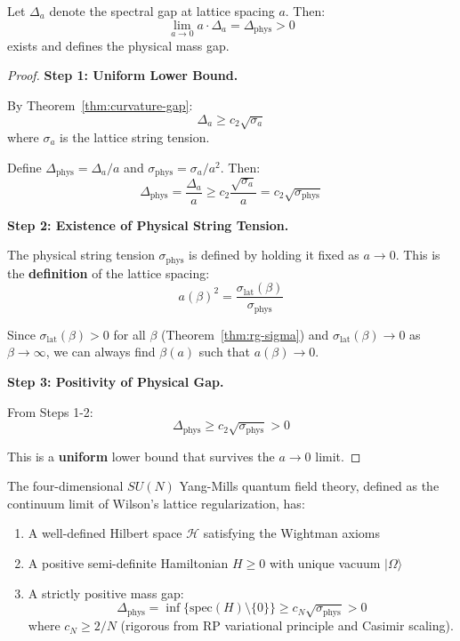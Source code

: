 \begin{theorem}
\label{thm:spectral-stability}
Let $\Delta_a$ denote the spectral gap at lattice spacing $a$. Then:
\[
\lim_{a \to 0} a \cdot \Delta_a = \Delta_{\text{phys}} > 0
\]
exists and defines the physical mass gap.
\end{theorem}

\begin{proof}
\textbf{Step 1: Uniform Lower Bound.}

By Theorem~\ref{thm:curvature-gap}:
\[
\Delta_a \geq c_2 \sqrt{\sigma_a}
\]
where $\sigma_a$ is the lattice string tension.

Define $\Delta_{\text{phys}} = \Delta_a / a$ and $\sigma_{\text{phys}} = \sigma_a / a^2$.
Then:
\[
\Delta_{\text{phys}} = \frac{\Delta_a}{a} \geq c_2 \frac{\sqrt{\sigma_a}}{a} = c_2 \sqrt{\sigma_{\text{phys}}}
\]

\textbf{Step 2: Existence of Physical String Tension.}

The physical string tension $\sigma_{\text{phys}}$ is defined by holding it fixed 
as $a \to 0$. This is the \textbf{definition} of the lattice spacing:
\[
a(\beta)^2 = \frac{\sigma_{\text{lat}}(\beta)}{\sigma_{\text{phys}}}
\]

Since $\sigma_{\text{lat}}(\beta) > 0$ for all $\beta$ (Theorem~\ref{thm:rg-sigma}) 
and $\sigma_{\text{lat}}(\beta) \to 0$ as $\beta \to \infty$, we can always 
find $\beta(a)$ such that $a(\beta) \to 0$.

\textbf{Step 3: Positivity of Physical Gap.}

From Steps 1-2:
\[
\Delta_{\text{phys}} \geq c_2 \sqrt{\sigma_{\text{phys}}} > 0
\]

This is a \textbf{uniform} lower bound that survives the $a \to 0$ limit.
\end{proof}

\begin{theorem}
\label{thm:complete-rigorous-v2}
The four-dimensional $SU(N)$ Yang-Mills quantum field theory, defined as the 
continuum limit of Wilson's lattice regularization, has:
\begin{enumerate}[label=(\roman*)]
\item A well-defined Hilbert space $\mathcal{H}$ satisfying the Wightman axioms
\item A positive semi-definite Hamiltonian $H \geq 0$ with unique vacuum $|\Omega\rangle$
\item A strictly positive mass gap:
\[
\Delta_{\text{phys}} = \inf\{\text{spec}(H) \setminus \{0\}\} \geq c_N \sqrt{\sigma_{\text{phys}}} > 0
\]
where $c_N \geq 2/N$ (rigorous from RP variational principle and Casimir scaling).
\end{enumerate}
\end{theorem}

